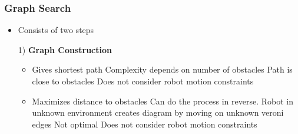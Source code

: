 \subsubsection{Graph Search}
\begin{itemize}
     Search path in connectivity graph of free space
    \item Consists of two steps
    \item[1)] \textbf{Graph Construction}
        \begin{itemize}
                \begin{itemize}
                    \item
                    \ipro Gives shortest path
                    \icon Complexity depends on number of obstacles
                    \icon Path is close to obstacles
                    \icon Does not consider robot motion constraints
                \end{itemize}
                \begin{itemize}
                    \item
                    \ipro Maximizes distance to obstacles
                    \ipro Can do the process in reverse. Robot in unknown environment creates diagram by moving on unknown veroni edges
                    \icon Not optimal
                    \icon Does not consider robot motion constraints
                \end{itemize}
                \begin{itemize}

\end{itemize}
\end{itemize}
\end{itemize}
